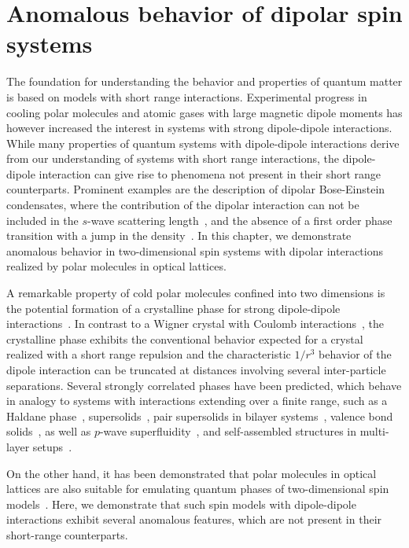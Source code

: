 \chapter{Anomalous behavior of dipolar spin systems}
\label{anomalous_behavior}

The foundation for understanding the behavior and properties of quantum matter
is based on models with short range interactions. Experimental progress
in cooling polar molecules and atomic gases with large magnetic dipole moments has however increased the interest in systems with strong dipole-dipole interactions. While many
properties of quantum systems with dipole-dipole interactions derive from our understanding
of systems with short range interactions, the dipole-dipole interaction can give rise to phenomena
not present in their short range counterparts. Prominent examples are the description of dipolar
Bose-Einstein condensates, where the contribution of the dipolar interaction can not be included
in the $s$-wave scattering length~\cite{Lahaye2009}, and the absence of a first order phase transition with a jump in the density~\cite{Spivak2004}.
In this chapter, we demonstrate anomalous behavior in two-dimensional spin systems with dipolar interactions realized by polar molecules in optical lattices.

A remarkable property of cold polar molecules confined into two dimensions is the potential formation
of a crystalline phase for strong dipole-dipole interactions~\cite{Buchler2007,Astrakharchik2007}. In contrast to a Wigner crystal with Coulomb
interactions~\cite{Bonsall1977}, the crystalline phase exhibits the conventional behavior expected for a crystal realized with a
short range repulsion and the characteristic $1/r^3$ behavior of the dipole interaction can be truncated
at distances involving several inter-particle separations. Several strongly correlated phases have been predicted, which
behave in analogy to systems with interactions extending over a finite range, such as a Haldane phase~\cite{DallaTorre2006a}, supersolids~\cite{Pollet2010,Capogrosso-Sansone2010}, pair supersolids in
bilayer systems~\cite{Trefzger2009}, valence bond solids~\cite{Bonnes2010},
as well as $p$-wave superfluidity~\cite{Cooper2009}, and self-assembled structures in multi-layer setups~\cite{Wang2006}.

On the other hand, it has been demonstrated that polar molecules in optical
lattices are also suitable for emulating quantum phases of two-dimensional spin models~\cite{Micheli2006,Gorshkov2011,Gorshkov2011c}.
Here, we demonstrate that such spin models with dipole-dipole interactions exhibit several anomalous features, which are not present in their short-range counterparts.

